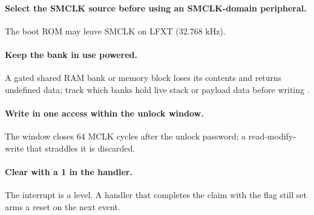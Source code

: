 \paragraph{Select the SMCLK source before using an SMCLK-domain peripheral.} The boot ROM may leave SMCLK on LFXT (32.768 kHz).

\paragraph{Keep the bank in use powered.} A gated shared RAM bank or memory block loses its contents and returns undefined data; track which banks hold live stack or payload data before writing .

\paragraph{Write  in one access within the unlock window.} The window closes 64 MCLK cycles after the unlock password; a read-modify-write that straddles it is discarded.

\paragraph{Clear  with a 1 in the handler.} The interrupt is a level. A handler that completes the claim with the flag still set arms a reset on the next event.
